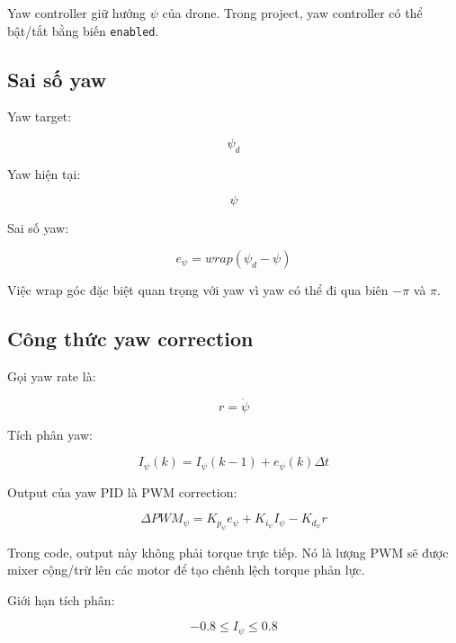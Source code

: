 Yaw controller giữ hướng $\psi$ của drone. Trong project, yaw controller có thể
bật/tắt bằng biến \texttt{enabled}.

\subsection{Sai số yaw}

Yaw target:

\begin{equation}
    \psi_d
\end{equation}

Yaw hiện tại:

\begin{equation}
    \psi
\end{equation}

Sai số yaw:

\begin{equation}
    e_\psi = wrap(\psi_d-\psi)
\end{equation}

Việc wrap góc đặc biệt quan trọng với yaw vì yaw có thể đi qua biên
$-\pi$ và $\pi$.

\subsection{Công thức yaw correction}

Gọi yaw rate là:

\begin{equation}
    r = \dot{\psi}
\end{equation}

Tích phân yaw:

\begin{equation}
    I_\psi(k)=I_\psi(k-1)+e_\psi(k)\Delta t
\end{equation}

Output của yaw PID là PWM correction:

\begin{equation}
    \Delta PWM_\psi
    =
    K_{p_\psi}e_\psi
    +
    K_{i_\psi}I_\psi
    -
    K_{d_\psi}r
\end{equation}

Trong code, output này không phải torque trực tiếp. Nó là lượng PWM sẽ được
mixer cộng/trừ lên các motor để tạo chênh lệch torque phản lực.

Giới hạn tích phân:

\begin{equation}
    -0.8 \leq I_\psi \leq 0.8
\end{equation}


